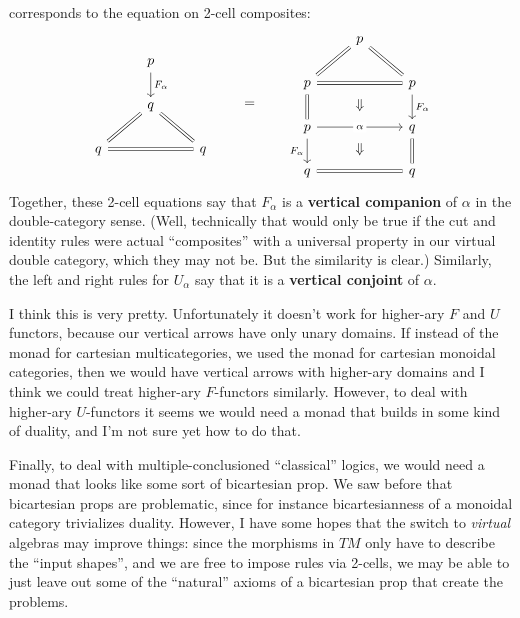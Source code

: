 \documentclass{article}
\begin{document}
corresponds to the equation on 2-cell composites:
\begin{equation*}
  \begin{tikzcd}
    & p \ar[d,"F_\alpha"] \\
    & q \ar[dl,equals] \ar[dr,equals]\\
    q \ar[rr,equals] && q
  \end{tikzcd}
  \qquad=\qquad
  \begin{tikzcd}
    & p \ar[dl,equals] \ar[dr,equals]\\
    p \ar[rr,equals] \ar[d,equals] \ar[drr,phantom,"\Downarrow"] && p \ar[d,"F_\alpha"]\\
    p \ar[rr,"\alpha" description] \ar[d,"F_\alpha"'] \ar[drr,phantom,"\Downarrow"] && q \ar[d,equals] \\
    q \ar[rr,equals] && q
  \end{tikzcd}
\end{equation*}
Together, these 2-cell equations say that $F_\alpha$ is a \textbf{vertical companion} of $\alpha$ in the double-category sense.
(Well, technically that would only be true if the cut and identity rules were actual ``composites'' with a universal property in our virtual double category, which they may not be.
But the similarity is clear.)
Similarly, the left and right rules for $U_\alpha$ say that it is a \textbf{vertical conjoint} of $\alpha$.

I think this is very pretty.
Unfortunately it doesn't work for higher-ary $F$ and $U$ functors, because our vertical arrows have only unary domains.
If instead of the monad for cartesian multicategories, we used the monad for cartesian monoidal categories, then we would have vertical arrows with higher-ary domains and I think we could treat higher-ary $F$-functors similarly.
However, to deal with higher-ary $U$-functors it seems we would need a monad that builds in some kind of duality, and I'm not sure yet how to do that.

Finally, to deal with multiple-conclusioned ``classical'' logics, we would need a monad that looks like some sort of bicartesian prop.
We saw before that bicartesian props are problematic, since for instance bicartesianness of a monoidal category trivializes duality.
However, I have some hopes that the switch to \emph{virtual} algebras may improve things: since the morphisms in $T M$ only have to describe the ``input shapes'', and we are free to impose rules via 2-cells, we may be able to just leave out some of the ``natural'' axioms of a bicartesian prop that create the problems.
\end{document}
